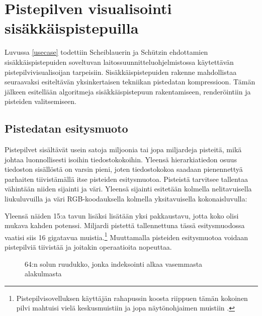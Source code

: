 \section{Pistepilven visualisointi sisäkkäispistepuilla}\label{mun}

Luvussa \ref{usecase} todettiin Scheiblauerin ja Schützin ehdottamien sisäkkäispistepuiden soveltuvan laitossuunnitteluohjelmistossa käytettävän pistepilvivisualisoijan tarpeisiin. Sisäkkäispistepuiden rakenne mahdollistaa seuraavaksi esiteltävän yksinkertaisen tekniikan pistedatan kompressioon. Tämän jälkeen esitellään algoritmeja sisäkkäispistepuun rakentamiseen, renderöintiin ja pisteiden valitsemiseen.    

\subsection{Pistedatan esitysmuoto}\label{kompressio}

Pistepilvet sisältävät usein satoja miljoonia tai jopa miljardeja pisteitä, mikä johtaa luonnollisesti isoihin tiedostokokoihin. Yleensä hierarkiatiedon osuus tiedoston sisällöstä on varsin pieni, joten tiedostokokoa saadaan pienennettyä parhaiten tiivistämällä itse pisteiden esitysmuotoa. Pisteistä tarvitsee tallentaa vähintään niiden sijainti ja väri. Yleensä sijainti esitetään kolmella nelitavuisella liukuluvuilla ja väri RGB-koodauksella kolmella yksitavuisella kokonaisluvulla:


\noindent Yleensä näiden 15:a tavun lisäksi lisätään yksi pakkaustavu, jotta koko olisi mukava kahden potenssi. Miljardi pistettä tallennettuna tässä esitysmuodossa vaatisi siis 16 gigatavua muistia.\footnote{Pistepilvisovelluksen käyttäjän rahapussin koosta riippuen tämän kokoinen pilvi mahtuisi vielä keskusmuistiin ja jopa näytönohjaimen muistiin \cite{rtx}.} Muuttamalla pisteiden esitysmuotoa voidaan pistepilviä tiivistää ja joitakin operaatioita nopeuttaa.

\begin{figure}
    
    \caption{64:n solun ruudukko, jonka indeksointi alkaa vasemmasta alakulmasta}
    \label{ruudukkokuva}
\end{figure}

